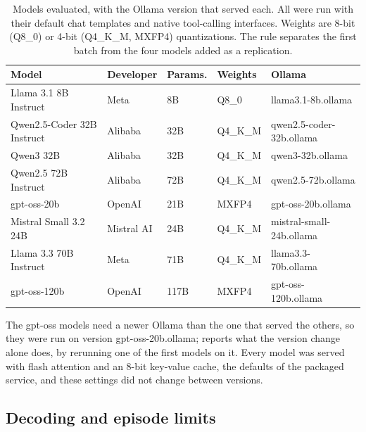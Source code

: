 \begin{table}[H]
\centering
\caption{Models evaluated, with the Ollama version that served each. All were run
with their default chat templates and native tool-calling interfaces. Weights
are 8-bit (Q8\_0) or 4-bit (Q4\_K\_M, MXFP4) quantizations. The rule separates
the first batch from the four models added as a replication.}
\label{tab:models}
\small
\setlength{\tabcolsep}{4pt}
\begin{tabular}{@{}lllll@{}}
\toprule
Model & Developer & Params. & Weights & Ollama \\
\midrule
Llama 3.1 8B Instruct \citep{Grattafiori2024Llama3} & Meta & 8B & Q8\_0 & \num{llama3.1-8b.ollama} \\
Qwen2.5-Coder 32B Instruct \citep{Hui2024QwenCoder} & Alibaba & 32B & Q4\_K\_M & \num{qwen2.5-coder-32b.ollama} \\
Qwen3 32B \citep{Yang2025Qwen3} & Alibaba & 32B & Q4\_K\_M & \num{qwen3-32b.ollama} \\
Qwen2.5 72B Instruct \citep{Qwen2025Qwen25} & Alibaba & 72B & Q4\_K\_M & \num{qwen2.5-72b.ollama} \\
\midrule
gpt-oss-20b \citep{OpenAI2025gptoss} & OpenAI & 21B & MXFP4 & \num{gpt-oss-20b.ollama} \\
Mistral Small 3.2 24B \citep{Mistral2025Small32} & Mistral AI & 24B & Q4\_K\_M & \num{mistral-small-24b.ollama} \\
Llama 3.3 70B Instruct \citep{Meta2024Llama33} & Meta & 71B & Q4\_K\_M & \num{llama3.3-70b.ollama} \\
gpt-oss-120b \citep{OpenAI2025gptoss} & OpenAI & 117B & MXFP4 & \num{gpt-oss-120b.ollama} \\
\bottomrule
\end{tabular}
\end{table}

The gpt-oss models need a newer Ollama than the one that served the others, so
they were run on version \num{gpt-oss-20b.ollama};  reports
what the version change alone does, by rerunning one of the first models on it.
Every model was served with flash attention and an 8-bit key-value cache, the
defaults of the packaged service, and these settings did not change between
versions.

\subsection{Decoding and episode limits}\label{sec:decoding}

